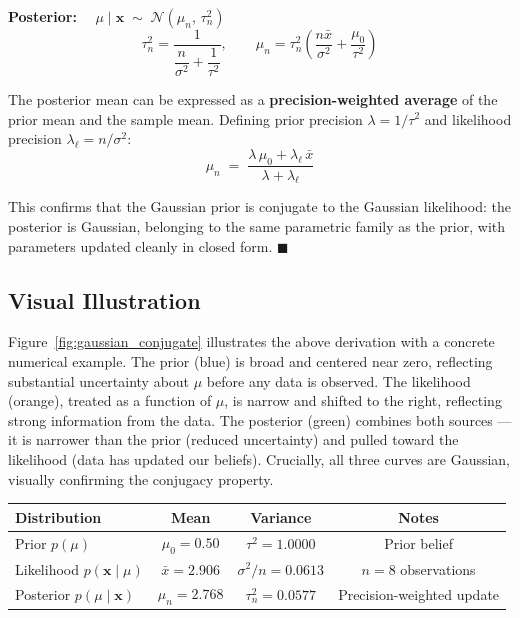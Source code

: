 \documentclass[11pt]{article}
\begin{document}
\begin{resultbox}
\textbf{Posterior:} $\quad\mu \mid \mathbf{x} \;\sim\; \mathcal{N}(\mu_n,\,\tau_n^2)$
\vspace{0.5em}
\[
  \tau_n^2 = \frac{1}{\dfrac{n}{\sigma^2} + \dfrac{1}{\tau^2}}, \qquad
  \mu_n = \tau_n^2\!\left(\frac{n\bar{x}}{\sigma^2} + \frac{\mu_0}{\tau^2}\right)
\]
\end{resultbox}

The posterior mean can be expressed as a \textbf{precision-weighted average} of the prior mean and the sample mean. Defining prior precision $\lambda = 1/\tau^2$ and likelihood precision $\lambda_\ell = n/\sigma^2$:
\[
  \mu_n \;=\; \frac{\lambda\,\mu_0 + \lambda_\ell\,\bar{x}}{\lambda + \lambda_\ell}
\]

This confirms that the Gaussian prior is conjugate to the Gaussian likelihood: the posterior is Gaussian, belonging to the same parametric family as the prior, with parameters updated cleanly in closed form. $\blacksquare$

\subsection*{Visual Illustration}

Figure~\ref{fig:gaussian_conjugate} illustrates the above derivation with a concrete numerical example. The prior (blue) is broad and centered near zero, reflecting substantial uncertainty about $\mu$ before any data is observed. The likelihood (orange), treated as a function of $\mu$, is narrow and shifted to the right, reflecting strong information from the data. The posterior (green) combines both sources — it is narrower than the prior (reduced uncertainty) and pulled toward the likelihood (data has updated our beliefs). Crucially, all three curves are Gaussian, visually confirming the conjugacy property.

\vspace{0.3em}
\begin{center}
\begin{tabular}{lccc}
  \hline
  \textbf{Distribution} & \textbf{Mean} & \textbf{Variance} & \textbf{Notes} \\
  \hline
  Prior $p(\mu)$                    & $\mu_0 = 0.50$ & $\tau^2 = 1.0000$       & Prior belief \\
  Likelihood $p(\mathbf{x}\mid\mu)$ & $\bar{x} = 2.906$ & $\sigma^2/n = 0.0613$ & $n = 8$ observations \\
  Posterior $p(\mu\mid\mathbf{x})$  & $\mu_n = 2.768$ & $\tau_n^2 = 0.0577$     & Precision-weighted update \\
  \hline
\end{tabular}
\end{center}
\vspace{0.3em}
\end{document}
